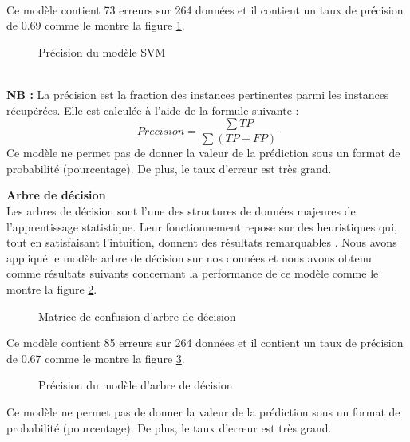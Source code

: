     \\
Ce modèle contient 73 erreurs sur 264 données et il contient un taux de précision de 0.69 comme le montre la figure \ref{fig:ConfusionMatrixSVMPrecision}.\\
   \begin{figure}[htpb]
    \centering
    \caption{Précision du modèle SVM}
    \label{fig:ConfusionMatrixSVMPrecision}
    \end{figure}
    \\
    \textbf{NB : }La précision est la fraction des instances pertinentes parmi les instances récupérées. Elle est calculée à l’aide de la formule suivante :
\[Precision=\frac{\sum{TP}}{\sum{(TP + FP)}}\]
    Ce modèle ne permet pas de donner la valeur de la prédiction sous un format de probabilité (pourcentage). De plus, le taux d’erreur est très grand.
    \newpage
    
\textbf{Arbre de décision} \\    
Les arbres de décision sont l’une des structures de données majeures de l’apprentissage statistique. Leur fonctionnement repose sur des heuristiques qui, tout en satisfaisant l’intuition, donnent des résultats remarquables \cite{DecisonTree}.
  Nous avons appliqué le modèle arbre de décision sur nos données et nous avons obtenu comme résultats suivants concernant la performance de ce modèle comme le montre la figure \ref{fig:ConfusionMatrixDecsionTree}.

     \begin{figure}[htpb]
    \centering
    \caption{Matrice de confusion d'arbre de décision}
    \label{fig:ConfusionMatrixDecsionTree}
    \end{figure}
    
Ce modèle contient 85 erreurs sur 264 données et il contient un taux de précision de 0.67 comme le montre la figure     \ref{fig:ConfusionMatrixDecisionTreePrecision}.
   \begin{figure}[htpb]
    \centering
    \caption{Précision du modèle d'arbre de décision}
    \label{fig:ConfusionMatrixDecisionTreePrecision}
    \end{figure}

    Ce modèle ne permet pas de donner la valeur de la prédiction sous un format de probabilité (pourcentage). De plus, le taux d’erreur est très grand.

